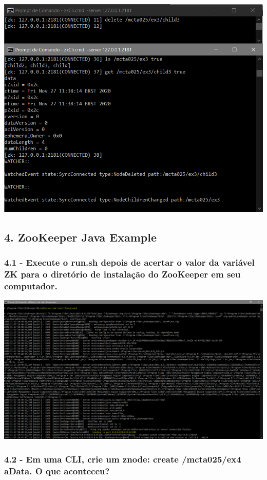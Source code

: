 \includegraphics{pratica3/prints/roteiro 3.9.PNG}

\subsection*{4. ZooKeeper Java Example}


\subsubsection{4.1 - Execute o run.sh depois de acertar o valor da variável ZK para o diretório de instalação do ZooKeeper em seu computador.}
\includegraphics[width=20cm]{pratica3/prints/server_started.PNG}

\subsubsection{4.2 - Em uma CLI, crie um znode: create /mcta025/ex4 aData. O que
aconteceu?}

